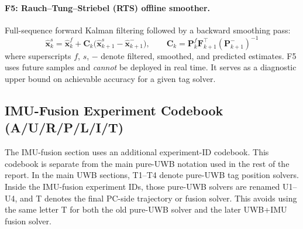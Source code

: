 \documentclass[11pt,a4paper]{article}
\begin{document}
\paragraph{F5: Rauch--Tung--Striebel (RTS) offline smoother.}
Full-sequence forward Kalman filtering followed by a backward smoothing pass:
\begin{equation}
  \hat{\mathbf{x}}_k^s = \hat{\mathbf{x}}_k^f + \mathbf{C}_k \bigl(\hat{\mathbf{x}}_{k+1}^s - \hat{\mathbf{x}}_{k+1}^{-}\bigr), \qquad
  \mathbf{C}_k = \mathbf{P}_k^f \mathbf{F}_{k+1}^\top (\mathbf{P}_{k+1}^{-})^{-1}
\end{equation}
where superscripts $f$, $s$, $-$ denote filtered, smoothed, and predicted estimates.
F5 uses future samples and \emph{cannot} be deployed in real time.
It serves as a diagnostic upper bound on achievable accuracy for a given tag solver.

\subsection{IMU-Fusion Experiment Codebook (A/U/R/P/L/I/T)}
\label{app:imu_codebook}

The IMU-fusion section uses an additional experiment-ID codebook.
This codebook is separate from the main pure-UWB notation used in the rest of the report.
In the main UWB sections, T1--T4 denote pure-UWB tag position solvers.
Inside the IMU-fusion experiment IDs, those pure-UWB solvers are renamed U1--U4, and T denotes the final PC-side trajectory or fusion solver.
This avoids using the same letter T for both the old pure-UWB solver and the later UWB+IMU fusion solver.
\end{document}
